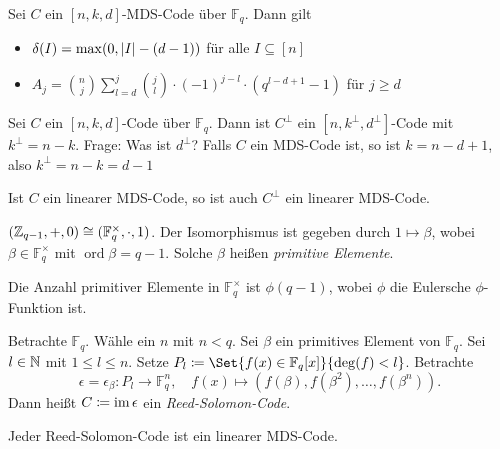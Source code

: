 \documentclass{cheat-sheet}
\newcommand{\F}{\mathbb{F}} %
\DeclareMathOperator{\ord}{ord} %
\begin{document}

\begin{satz}
  Sei $C$ ein $[n, k, d]$-MDS-Code über $\F_q$. %
  Dann gilt
  \begin{itemize}
    \item $\delta(I) = \max ( 0, \lvert I\rvert - (d-1) )$ \enspace
    für alle $I \subseteq [n]$
    \item $A_j = \binom{n}{j} \sum_{l=d}^j \binom{j}{l} \cdot (-1)^{j-l} \cdot (q^{l-d+1} - 1)$ \enspace
    für $j \geq d$
  \end{itemize}
\end{satz}


Sei $C$ ein $[n, k, d]$-Code über $\F_q$.
Dann ist $C^\perp$ ein $[n, k^\perp, d^\perp]$-Code mit $k^\perp = n - k$.
Frage: Was ist $d^\perp$?
Falls $C$ ein MDS-Code ist, so ist $k = n - d + 1$, also $k^\perp = n - k = d - 1$

\begin{satz}
  Ist $C$ ein linearer MDS-Code, so ist auch $C^\perp$ ein linearer MDS-Code.
\end{satz}


\begin{lem}
  $(\Z_{q-1}, +, 0) \cong (\F_q^{\times}, \cdot, 1)$.
  Der Isomorphismus ist gegeben durch $1 \mapsto \beta$, wobei $\beta \in \F_q^{\times}$ mit $\ord{\beta} = q-1$.
  Solche $\beta$ heißen \emph{primitive Elemente}.
\end{lem}

\begin{bem}
  Die Anzahl primitiver Elemente in $\F_q^{\times}$ ist $\phi(q-1)$, wobei $\phi$ die Eulersche $\phi$-Funktion ist.
\end{bem}

\begin{defn}
  Betrachte $\F_q$.
  Wähle ein $n$ mit $n < q$.
  Sei $\beta$ ein primitives Element von $\F_q$.
  Sei $l \in \mathbb{N}$ mit $1 \leq l \leq n$.
  Setze $P_l \coloneqq \Set{f(x) \in \F_q[x]}{\deg(f) < l}$.
  Betrachte
  \[
    \epsilon = \epsilon_\beta : P_l \to \F_q^n, \quad
    f(x) \mapsto (f(\beta), f(\beta^2), \ldots, f(\beta^n)).
  \]
  Dann heißt $C \coloneqq \operatorname{im} \epsilon$ ein \emph{Reed-Solomon-Code}.
\end{defn}

\begin{satz}
  Jeder Reed-Solomon-Code ist ein linearer MDS-Code.
\end{satz}
\end{document}
